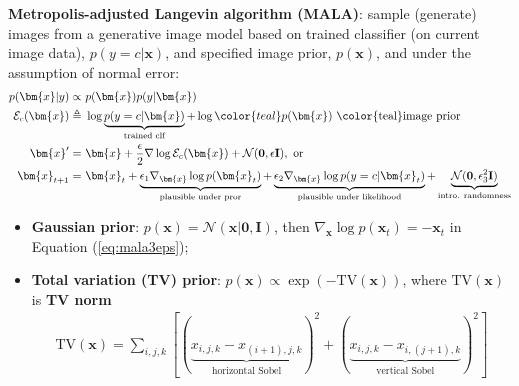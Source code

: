 \textbf{Metropolis-adjusted Langevin algorithm (MALA)}: 
sample (generate) images from a generative image model based on trained classifier 
(on current image data), $p(y=c|\bm{x})$, and specified image prior, $p(\bm{x})$,
and under the assumption of normal error:
\begin{align}
    p(\bm{x}|y)                     \propto&~     p(\bm{x})p(y|\bm{x}) \\
    \mathcal{E}_c(\bm{x})           \triangleq&~  \log\underbrace{p(y=c|\bm{x})}_\text{trained clf} + \log{\color{teal}p(\bm{x})}~\text{\color{teal}image prior} \\
    \bm{x}'                         =&~           \bm{x} + \frac{\epsilon}{2}\nabla\log{\mathcal{E}_c(\bm{x})} + \mathcal{N}(\mathbf{0},\epsilon\mathbf{I}),~\text{or} \\
    \bm{x}_{t+1}                    =&~           \bm{x}_t 
        + \underbrace{\epsilon_1\nabla_{\bm{x}}\log{p(\bm{x}_t)}}_{\text{plausible under pror}} 
        + \underbrace{\epsilon_2\nabla_{\bm{x}}\log{p(y=c|\bm{x}_t)}}_{\text{plausible under likelihood}} 
        + \underbrace{\mathcal{N}(\mathbf{0},\epsilon_3^2\mathbf{I})}_{\text{intro. randomness}} \label{eq:mala3eps}
\end{align}
\begin{itemize}
    \item \textbf{Gaussian prior}: $p(\bm{x})=\mathcal{N}(\bm{x}|\mathbf{0},\mathbf{I})$, 
    then $\nabla_{\bm{x}}\log{p(\bm{x}_t)}=-\bm{x}_t$ in Equation (\ref{eq:mala3eps});
    \item \textbf{Total variation (TV) prior}: $p(\bm{x})\propto\exp{(-\mathrm{TV}(\bm{x}))}$, 
    where $\mathrm{TV}(\bm{x})$ is \textbf{TV norm}
    \begin{gather}
        \mathrm{TV}(\bm{x})=\sum_{i,j,k}[
            (\underbrace{x_{i,j,k}-x_{(i+1),j,k}}_\text{horizontal Sobel})^2 + 
            (\underbrace{x_{i,j,k}-x_{i,(j+1),k}}_\text{vertical Sobel})^2
        ]
    \end{gather}
\end{itemize}


